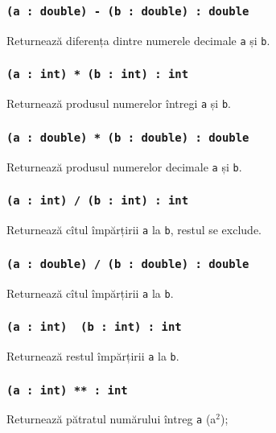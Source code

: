\subsubsection{\texttt{(a : double) - (b : double) : double}}

Returnează diferența dintre numerele decimale \texttt{a} și \texttt{b}.

\subsubsection{\texttt{(a : int) * (b : int) : int}}

Returnează produsul numerelor întregi \texttt{a} și \texttt{b}.

\subsubsection{\texttt{(a : double) * (b : double) : double}}

Returnează produsul numerelor decimale \texttt{a} și \texttt{b}.

\subsubsection{\texttt{(a : int) / (b : int) : int}}

Returnează cîtul împărțirii \texttt{a} la \texttt{b}, restul se exclude.

\subsubsection{\texttt{(a : double) / (b : double) : double}}

Returnează cîtul împărțirii \texttt{a} la \texttt{b}.

\subsubsection{\texttt{(a : int) \ (b : int) : int}}

Returnează restul împărțirii \texttt{a} la \texttt{b}.


\subsubsection{\texttt{(a : int) ** : int}}

Returnează pătratul numărului întreg \texttt{a} (a$^2$);

